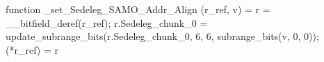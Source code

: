 function _set_Sedeleg_SAMO_Addr_Align (r_ref, v) = {
    r = __bitfield_deref(r_ref);
    r.Sedeleg_chunk_0 = update_subrange_bits(r.Sedeleg_chunk_0, 6, 6, subrange_bits(v, 0, 0));
    (*r_ref) = r
}
